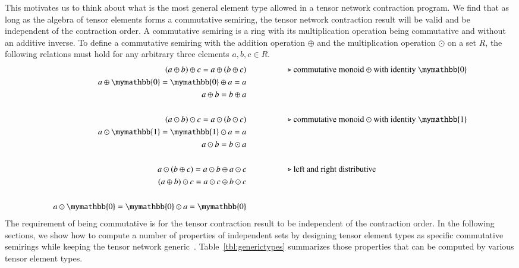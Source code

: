 \documentclass[onefignum, onetabnum]{siamart190516}
\newcommand{\<}{\langle}
\renewcommand{\>}{\rangle}
\begin{document}
This motivates us to think about what is the most general element type allowed in a tensor network contraction program.
We find that as long as the algebra of tensor elements forms a commutative semiring, the tensor network contraction result will be valid and be independent of the contraction order.
A commutative semiring is a ring with its multiplication operation being commutative and without an additive inverse.
To define a commutative semiring with the addition operation $\oplus$ and the multiplication operation $\odot$ on a set $R$, the following relations must hold for any arbitrary three elements $a, b, c \in R$.
\begin{align*}
(a \oplus b) \oplus c = a \oplus (b \oplus c) & \hspace{5em}\text{$\triangleright$ commutative monoid $\oplus$ with identity $\mymathbb{0}$}\\
a \oplus \mymathbb{0} = \mymathbb{0} \oplus a = a &\\
a \oplus b = b \oplus a &\\
&\\
(a \odot b) \odot c = a \odot (b \odot c)  &   \hspace{5em}\text{$\triangleright$ commutative monoid $\odot$ with identity $\mymathbb{1}$}\\
a \odot  \mymathbb{1} =  \mymathbb{1} \odot a = a &\\
a \odot b = b \odot a &\\
&\\
a \odot (b\oplus c) = a\odot b \oplus a\odot c  &  \hspace{5em}\text{$\triangleright$ left and right distributive}\\
(a\oplus b) \odot c = a\odot c \oplus b\odot c &\\
&\\
a \odot \mymathbb{0} = \mymathbb{0} \odot a = \mymathbb{0}
\end{align*}
The requirement of being commutative is for the tensor contraction result to be independent of the contraction order.
In the following sections, we show how to compute a number of properties of independent sets by designing tensor element types as specific commutative semirings while keeping the tensor network generic~\cite{Stepanov2014}.
Table~\ref{tbl:generictypes} summarizes those properties that can be computed by various tensor element types.
\end{document}
